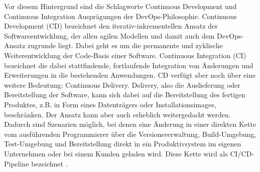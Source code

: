 Vor diesem Hintergrund sind die Schlagworte \glqq{}Continuous Development\grqq{} und \glqq{}Continuous Integration\grqq{} Ausprägungen der \gls{DevOps}-Philosophie. Continuous Development (\acrshort{CD}) bezeichnet den iterativ-inkrementellen Ansatz der Softwareentwicklung, der allen agilen Modellen und damit auch dem \gls{DevOps}-Ansatz zugrunde liegt. Dabei geht es um die permanente und zyklische Weiterentwicklung der Code-Basis einer Software. Continuous Integration (\acrshort{CI}) bezeichnet die dabei stattfindende, fortlaufende Integration von Änderungen und Erweiterungen in die bestehenden Anwendungen. \acrshort{CD} verfügt aber noch über eine weitere Bedeutung: Continuous Delivery. Delivery, also die Auslieferung oder Bereitstellung der Software, kann sich dabei auf die Bereitstellung des fertigen Produktes, z.B. in Form eines Datenträgers oder Installationsimages, beschränken. Der Ansatz kann aber auch erheblich weitergedacht werden. Dadurch sind Szenarien möglich, bei denen eine Änderung in einer direkten Kette vom ausführenden Programmierer über die Versionsverwaltung, Build-Umgebung, Test-Umgebung und Bereitstellung direkt in ein Produktivsystem im eigenen Unternehmen oder bei einem Kunden geladen wird. Diese Kette wird als \acrshort{CI}/\acrshort{CD}-Pipeline bezeichnet \cite{DevOps_Definition_Microsoft}  \cite{DevOps_Definition_AWS} \cite{atlassian_CivsCDvsCD_nodate} \cite{NodeRed_CICD_nodate}. 